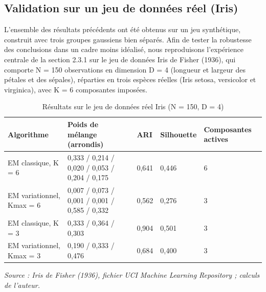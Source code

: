 \subsection{Validation sur un jeu de données réel (Iris)}
L'ensemble des résultats précédents ont été obtenus sur un jeu synthétique, construit avec trois groupes gaussiens bien séparés. Afin de tester la robustesse des conclusions dans un cadre moins idéalisé, nous reproduisons l'expérience centrale de la section 2.3.1 sur le jeu de données Iris de Fisher (1936), qui comporte N = 150 observations en dimension D = 4 (longueur et largeur des pétales et des sépales), réparties en trois espèces réelles (Iris setosa, versicolor et virginica), avec K = 6 composantes imposées.

\begin{table}[H]
\centering
\small
\setlength{\tabcolsep}{0.14cm}
\begin{tabular}{|p{2.77cm}|p{4.2cm}|p{1.6cm}|p{1.9cm}|p{2.3cm}|}
\hline
\textbf{Algorithme} & \textbf{Poids de mélange (arrondis)} & \textbf{ARI} & \textbf{Silhouette} & \textbf{Composantes actives} \\
\hline
EM classique, K = 6 & 0,333 / 0,214 / 0,020 / 0,053 / 0,204 / 0,175 & 0,641 & 0,446 & 6 \\
\hline
EM variationnel, Kmax = 6 & 0,007 / 0,073 / 0,001 / 0,001 / 0,585 / 0,332 & 0,562 & 0,276 & 3 \\
\hline
EM classique, K = 3 & 0,333 / 0,364 / 0,303 & 0,904 & 0,501 & 3 \\
\hline
EM variationnel, Kmax = 3 & 0,190 / 0,333 / 0,476 & 0,684 & 0,400 & 3 \\
\hline
\end{tabular}
\caption{Résultats sur le jeu de données réel Iris (N = 150, D = 4)}
\label{tab:2_13}
\end{table}
\emph{Source : Iris de Fisher (1936), fichier UCI Machine Learning Repository ; calculs de l'auteur.}

